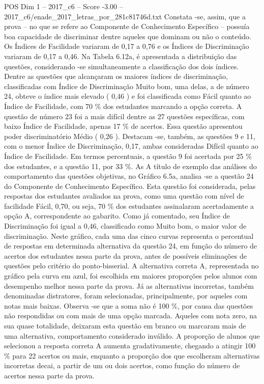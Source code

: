 \begin{textsample}{POS Dim 1 – 2017\_c6 – Score -3.00 – 2017\_c6/enade\_2017\_letras\_por\_281c81746d.txt}
Constata -se, assim, que a prova – no que se refere ao Componente de Conhecimento Específico – possuía boa capacidade de discriminar dentre aqueles que dominam ou não o conteúdo.
Os Índices de Facilidade variaram de 0,17 a 0,76 e os Índices de Discriminação variaram de 0,17 a 0,46.
Na Tabela 6.12a, é apresentada a distribuição das questões, considerando -se simultaneamente a classificação dos dois índices.
Dentre as questões que alcançaram os maiores índices de discriminação, classificadas com Índice de Discriminação Muito bom, uma delas, a de número 24, obteve o índice mais elevado ( 0,46 ) e foi classificada como Fácil quanto ao Índice de Facilidade, com 70 \% dos estudantes marcando a opção correta.
A questão de número 23 foi a mais difícil dentre as 27 questões específicas, com baixo Índice de Facilidade, apenas 17 \% de acertos.
Essa questão apresentou poder discriminatório Médio ( 0,26 ).
Destacam -se, também, as questões 9 e 11, com o menor Índice de Discriminação, 0,17, ambas consideradas Difícil quanto ao Índice de Facilidade.
Em termos percentuais, a questão 9 foi acertada por 25 \% dos estudantes, e a questão 11, por 33 \%.
As A título de exemplo das análises do comportamento das questões objetivas, no Gráfico 6.5a, analisa -se a questão 24 do Componente de Conhecimento Específico.
Esta questão foi considerada, pelas respostas dos estudantes avaliados na prova, como uma questão com nível de facilidade Fácil, 0,70, ou seja, 70 \% dos estudantes assinalaram acertadamente a opção A, correspondente ao gabarito.
Como já comentado, seu Índice de Discriminação foi igual a 0,46, classificado como Muito bom, o maior valor de discriminação.
Neste gráfico, cada uma das cinco curvas representa o percentual de respostas em determinada alternativa da questão 24, em função do número de acertos dos estudantes nessa parte da prova, antes de possíveis eliminações de questões pelo critério do ponto-bisserial.
A alternativa correta A, representada no gráfico pela curva em azul, foi escolhida em maiores proporções pelos alunos com desempenho melhor nessa parte da prova.
Já as alternativas incorretas, também denominadas distratores, foram selecionadas, principalmente, por aqueles com notas mais baixas.
Observa -se que a soma não é 100 \%, por causa das questões não respondidas ou com mais de uma opção marcada.
Aqueles com nota zero, na sua quase totalidade, deixaram esta questão em branco ou marcaram mais de uma alternativa, comportamento considerado inválido.
A proporção de alunos que selecionou a resposta correta A aumenta gradativamente, chegando a atingir 100 \% para 22 acertos ou mais, enquanto a proporção dos que escolheram alternativas incorretas decai, a partir de um ou dois acertos, como função do número de acertos nessa parte da prova.

\end{textsample}
